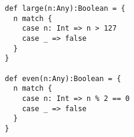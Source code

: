 \begin{lstlisting}[style=reclojureScala]
def large(n:Any):Boolean = {
  n match {
    case n: Int => n > 127
    case _ => false
  }
}

def even(n:Any):Boolean = {
  n match {
    case n: Int => n % 2 == 0
    case _ => false
  }
}
\end{lstlisting}
